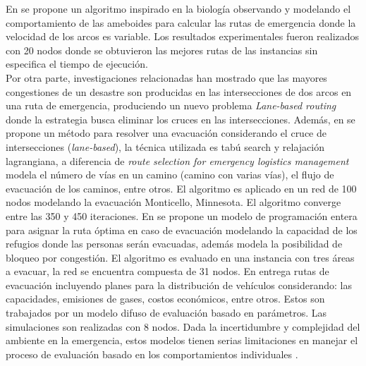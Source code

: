 En \cite{zhang2013route} se propone un algoritmo inspirado en la biología observando y modelando el comportamiento de las ameboides para calcular las rutas de emergencia donde la velocidad de los arcos es variable. Los resultados experimentales fueron realizados con 20 nodos donde se obtuvieron las mejores rutas de las instancias sin especifica el tiempo de ejecución.\\
Por otra parte, investigaciones relacionadas \cite{southworth1991regional,cova2003network} han mostrado que las mayores congestiones de un desastre son producidas en las intersecciones de dos arcos en una ruta de emergencia, produciendo un nuevo problema \textit{Lane-based routing} donde la estrategia busca eliminar los cruces en las intersecciones. 
Además, en \cite{xie2011lane} se propone un método para resolver una evacuación considerando el cruce de intersecciones (\textit{lane-based}), la técnica utilizada es tabú search y relajación lagrangiana, a diferencia de \textit{route selection for emergency logistics management} modela el número de vías en un camino (camino con varias vías), el flujo de evacuación de los caminos, entre otros. El algoritmo es aplicado en un red de 100 nodos modelando la evacuación Monticello, Minnesota. El algoritmo converge entre las 350 y 450 iteraciones.
En \cite{stepanov2009multi} se propone un modelo de programación entera para asignar la ruta óptima en caso de evacuación modelando la capacidad de los refugios donde las personas serán evacuadas, además modela la posibilidad de bloqueo por congestión. El algoritmo es evaluado en una instancia con tres áreas a evacuar, la red se encuentra compuesta de 31 nodos.
En \cite{tan2011if} entrega rutas de evacuación incluyendo planes para la distribución de vehículos considerando: las capacidades, emisiones de gases, costos económicos, entre otros. Estos son trabajados por un modelo difuso de evaluación basado en parámetros. Las simulaciones son realizadas con 8 nodos. Dada la incertidumbre y complejidad del ambiente en la emergencia, estos modelos tienen serias limitaciones en manejar el proceso de evaluación basado en los comportamientos individuales \cite{liu2016evacuation}.\\

